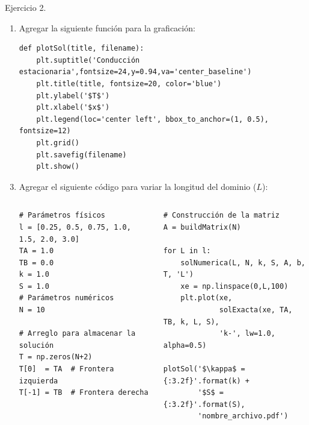 \documentclass{beamer}
\begin{document}
\begin{frame}[fragile]
	
{\small 
\begin{exampleblock}{Ejercicio 2.}

\begin{enumerate}[c]
\item Agregar la siguiente función para la graficación:

\begin{lstlisting}
def plotSol(title, filename):
    plt.suptitle('Conducción estacionaria',fontsize=24,y=0.94,va='center_baseline')
    plt.title(title, fontsize=20, color='blue')
    plt.ylabel('$T$')
    plt.xlabel('$x$')
    plt.legend(loc='center left', bbox_to_anchor=(1, 0.5), fontsize=12)
    plt.grid()
    plt.savefig(filename)
    plt.show()
\end{lstlisting}
\end{enumerate}
\begin{enumerate}
\setcounter{enumi}{2}
\item Agregar el siguiente código para variar la longitud del dominio ($L$): \label{en:codigo}
\begin{columns}[t]
\begin{column}{0.48\textwidth}
\begin{lstlisting}
# Parámetros físicos
l = [0.25, 0.5, 0.75, 1.0, 1.5, 2.0, 3.0]
TA = 1.0
TB = 0.0
k = 1.0
S = 1.0
# Parámetros numéricos
N = 10

# Arreglo para almacenar la solución
T = np.zeros(N+2)
T[0]  = TA  # Frontera izquierda
T[-1] = TB  # Frontera derecha
\end{lstlisting}		
\end{column}
\begin{column}{0.48\textwidth}
\begin{lstlisting}
# Construcción de la matriz
A = buildMatrix(N)

for L in l:
    solNumerica(L, N, k, S, A, b, T, 'L')
    xe = np.linspace(0,L,100)
    plt.plot(xe, 
             solExacta(xe, TA, TB, k, L, S), 
             'k-', lw=1.0, alpha=0.5)

plotSol('$\kappa$ = {:3.2f}'.format(k) + 
        '$S$ = {:3.2f}'.format(S), 
        'nombre_archivo.pdf')
\end{lstlisting}		
\end{column}
\end{columns}

\end{enumerate}
\end{exampleblock}
}
\end{frame}
\end{document}
